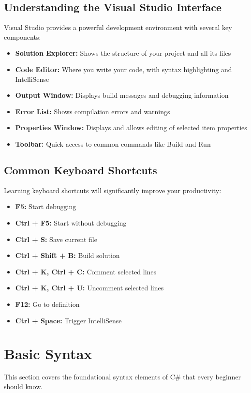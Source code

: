 \documentclass{article}
\begin{document}
\subsection{Understanding the Visual Studio Interface}
Visual Studio provides a powerful development environment with several key components:

\begin{itemize}
    \item \textbf{Solution Explorer:} Shows the structure of your project and all its files
    \item \textbf{Code Editor:} Where you write your code, with syntax highlighting and IntelliSense
    \item \textbf{Output Window:} Displays build messages and debugging information
    \item \textbf{Error List:} Shows compilation errors and warnings
    \item \textbf{Properties Window:} Displays and allows editing of selected item properties
    \item \textbf{Toolbar:} Quick access to common commands like Build and Run
\end{itemize}

\subsection{Common Keyboard Shortcuts}
Learning keyboard shortcuts will significantly improve your productivity:

\begin{itemize}
    \item \textbf{F5:} Start debugging
    \item \textbf{Ctrl + F5:} Start without debugging
    \item \textbf{Ctrl + S:} Save current file
    \item \textbf{Ctrl + Shift + B:} Build solution
    \item \textbf{Ctrl + K, Ctrl + C:} Comment selected lines
    \item \textbf{Ctrl + K, Ctrl + U:} Uncomment selected lines
    \item \textbf{F12:} Go to definition
    \item \textbf{Ctrl + Space:} Trigger IntelliSense
\end{itemize}

\section{Basic Syntax}
This section covers the foundational syntax elements of C\# that every beginner should know.
\end{document}
